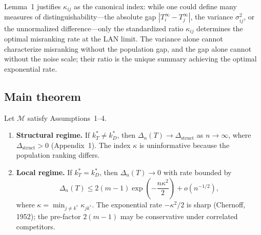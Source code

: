 \documentclass[lineno]{biometrika}
\begin{document}
Lemma~1 justifies $\kappa_{ij}$ as the canonical index: while one could define many measures of distinguishability---the absolute gap $|T_i^\infty - T_j^\infty|$, the variance $\sigma_{ij}^2$, or the unnormalized difference---only the standardized ratio $\kappa_{ij}$ determines the optimal misranking rate at the LAN limit. The variance alone cannot characterize misranking without the population gap, and the gap alone cannot without the noise scale; their ratio is the unique summary achieving the optimal exponential rate.

\subsection{Main theorem}

\begin{theorem}\label{thm:main}
Let $\mathcal{M}$ satisfy Assumptions~1--4.

\begin{enumerate}
\item[(i)] \textbf{Structural regime.} If $k_T^* \neq k_D^*$, then $\Delta_n(T) \to \Delta_{\text{struct}}$ as $n\to\infty$, where $\Delta_{\text{struct}} > 0$ (Appendix~1). The index $\kappa$ is uninformative because the population ranking differs.

\item[(ii)] \textbf{Local regime.} If $k_T^* = k_D^*$, then $\Delta_n(T) \to 0$ with rate bounded by
\[
\Delta_n(T) \leq 2(m-1) \exp\!\left(-\frac{n\kappa^2}{2}\right) + o(n^{-1/2}),
\]
where $\kappa = \min_{j\neq k^*} \kappa_{jk^*}$. The exponential rate $-\kappa^2/2$ is sharp (Chernoff, 1952); the pre-factor $2(m-1)$ may be conservative under correlated competitors.
\end{enumerate}
\end{theorem}
\end{document}
